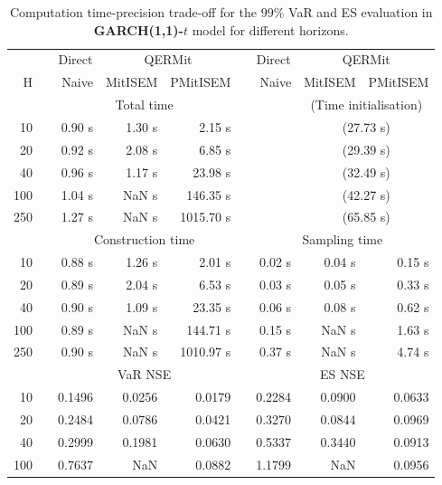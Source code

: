 \footnotesize{  
{ \renewcommand{\arraystretch}{1.3} 
\begin{longtable}{rr rrr r rrr}  
\caption{Computation time-precision trade-off for the  $99\%$ VaR and ES evaluation in \textbf{GARCH(1,1)-$t$} model for different horizons.} 
\label{tab:time_precision_t_garch2_noS_ML} \\ 
 & & \multicolumn{1}{c}{Direct} & \multicolumn{2}{c}{QERMit}&  & \multicolumn{1}{c}{Direct} & \multicolumn{2}{c}{QERMit} \\ \cline{3-5} \cline{7-9} 
 H & & Naive & MitISEM & PMitISEM & & Naive & MitISEM & PMitISEM \\ \hline 
 & & \multicolumn{3}{c}{Total time} & & & \multicolumn{2}{c}{(Time initialisation)}  \\ \cline{3-5} \cline{8-9}
10 & & 0.90 s & 1.30 s & 2.15 s &&& \multicolumn{2}{c}{(27.73 s)} \\ 
20 & & 0.92 s & 2.08 s & 6.85 s &&& \multicolumn{2}{c}{(29.39 s)} \\ 
40 & & 0.96 s & 1.17 s & 23.98 s &&& \multicolumn{2}{c}{(32.49 s)} \\ 
100 & & 1.04 s &  NaN s & 146.35 s &&& \multicolumn{2}{c}{(42.27 s)} \\ 
250 & & 1.27 s &  NaN s & 1015.70 s &&& \multicolumn{2}{c}{(65.85 s)} \\ 
\hline 
 & & \multicolumn{3}{c}{Construction time} & & \multicolumn{3}{c}{ Sampling time} \\ \cline{3-5}  \cline{7-9}
10 & & 0.88 s & 1.26 s & 2.01 s &&  0.02 s & 0.04 s & 0.15 s \\ 
20 & & 0.89 s & 2.04 s & 6.53 s &&  0.03 s & 0.05 s & 0.33 s \\ 
40 & & 0.90 s & 1.09 s & 23.35 s &&  0.06 s & 0.08 s & 0.62 s \\ 
100 & & 0.89 s &  NaN s & 144.71 s &&  0.15 s &  NaN s & 1.63 s \\ 
250 & & 0.90 s &  NaN s & 1010.97 s &&  0.37 s &  NaN s & 4.74 s \\ 
\hline 
 & & \multicolumn{3}{c}{VaR NSE} &&  \multicolumn{3}{c}{ES NSE} \\ \cline{3-5}  \cline{7-9}
10 && 0.1496  & 0.0256  & 0.0179 && 0.2284  & 0.0900  & 0.0633  \\ 
20 && 0.2484  & 0.0786  & 0.0421 && 0.3270  & 0.0844  & 0.0969  \\ 
40 && 0.2999  & 0.1981  & 0.0630 && 0.5337  & 0.3440  & 0.0913  \\ 
100 && 0.7637  &    NaN  & 0.0882 && 1.1799  &    NaN  & 0.0956  \\ 

\end{longtable}}}
